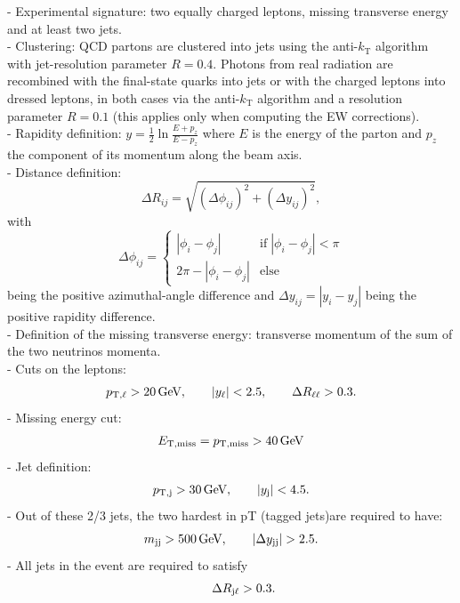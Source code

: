 \documentclass[a4paper,10pt]{report}
\begin{document}
%
- Experimental signature:
two equally charged leptons, missing transverse energy and at least two jets. \\
- Clustering: QCD partons are clustered into jets using the anti-$k_\text{T}$ algorithm  with jet-resolution parameter $R=0.4$.
Photons from real radiation are recombined with the final-state quarks into jets or with the charged leptons into dressed leptons, in both cases via the anti-$k_\text{T}$ algorithm and a resolution parameter $R=0.1$ 
(this applies only when computing the EW corrections). \\
%
- Rapidity definition: $y=\frac{1}{2}\ln \frac{E+p_z}{E-p_z}$ where $E$ is the energy of the parton and $p_z$ the component of its momentum along the beam axis. \\
%
- Distance definition:
\begin{equation}
        \Delta R_{ij} = \sqrt{(\Delta \phi_{ij})^2+(\Delta y_{ij})^2},
\end{equation}
with
\begin{equation}
\Delta \phi_{ij} = \begin{cases}
|\phi_i-\phi_j|         & \text{if} \; |\phi_i-\phi_j| < \pi \\
2 \pi - |\phi_i-\phi_j| & \text{else}
\end{cases}
\end{equation}
being the positive azimuthal-angle difference and $\Delta y_{ij} = |y_i - y_j|$ being the positive rapidity difference. \\
%
- Definition of the missing transverse energy: transverse momentum of the sum of the two neutrinos momenta. \\
%
- Cuts on the leptons:
\begin{align}
 p_{\text{T},\ell} >  20\,\text{GeV},\qquad |y_{\ell}| < 2.5, \qquad \Delta R_{\ell\ell}> 0.3.
\end{align}
%
- Missing energy cut:
\begin{align}
  E_{\text{T},\text{miss}}=p_{\rm T, miss} >  40\,\text{GeV}
\end{align}
%
- Jet definition:
%
\begin{align}
 p_{\text{T},\text{j}} >  30\,\text{GeV}, \qquad |y_\text{j}| < 4.5 .
\end{align}
%
- Out of these 2/3 jets, the two hardest in pT (tagged jets)are required to have:
\begin{align}
 m_{\text{j} \text{j}} >  500\,\text{GeV},\qquad |\Delta y_{\text{j} \text{j}}| > 2.5.
\end{align}
%
- All jets in the event are required to satisfy 
\begin{align}
 \qquad\Delta R_{\text{j}\ell} > 0.3 .
\end{align}
\end{document}
